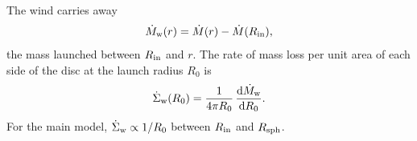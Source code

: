 
The wind carries away
\begin{equation}
\dot M_{\rm w}(r) = \dot M(r) - \dot M(R_{\rm in}),
\label{eq:Mdotw}
\end{equation}
the mass launched between $R_{\rm in}$ and $r$.
The rate of mass loss per unit area of each side of the disc at the launch radius $R_0$ is
\begin{equation}
\dot\Sigma_{\rm w}(R_0) = \frac{1}{4\pi R_0}\,\frac{{\rm d}\dot M_{\rm w}}{{\rm d}R_0} .
\label{eq:Sigmadotw}
\end{equation}
For the main model, $\dot\Sigma_{\rm w} \propto 1/R_0$ between $R_{\rm in}$ and $R_{\rm sph}$.


